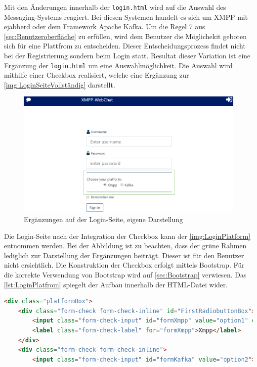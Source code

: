 \documentclass[a4paper,titlepage,halfparskip,12pt]{scrreprt}
\begin{document}
\begin{onehalfspacing}
Mit den Änderungen innerhalb der \texttt{login.html} wird auf die Auswahl des Messaging-Systems reagiert. Bei diesen Systemen handelt es sich um XMPP mit ejabberd oder dem Framework Apache Kafka. Um die Regel 7 aus \autoref{sec:Benutzeroberfläche} zu erfüllen, wird dem Benutzer die Möglichekit geboten sich für eine Plattfrom zu entscheiden. Dieser Entscheidungsprozess findet nicht bei der Registrierung sondern beim Login statt. Resultat dieser Variation ist eine Ergänzung der \texttt{login.html} um eine Auswahlmöglichkeit. Die Auswahl wird mithilfe einer Checkbox realisiert, welche eine Ergänzung zur \autoref{img:LoginSeiteVollständig} darstellt.
\begin{figure}[h]
	\centering
	\includegraphics[scale=0.4]{images/LoginPlatform}
	\caption{Ergänzungen auf der Login-Seite, eigene Darstellung}
	\label{img:LoginPlatform}
\end{figure}
Die Login-Seite nach der Integration der Checkbox kann der \autoref{img:LoginPlatform} entnommen werden. Bei der Abbildung ist zu beachten, dass der grüne Rahmen lediglich zur Darstellung der Ergänzungen beiträgt. Dieser ist für den Benutzer nicht ersichtlich. Die Konstruktion der Checkbox erfolgt mittels Bootstrap. Für die korrekte Verwendung von Bootstrap wird auf \autoref{sec:Bootstrap} verwiesen. Das \autoref{lst:LoginPlatfrom} spiegelt der Aufbau innerhalb der HTML-Datei wider.
\begin{lstlisting}[language=HTML,caption=Implementierung der Checkbox für die Plattform ,label={lst:LoginPlatfrom}]
<div class="platformBox">
	<div class="form-check form-check-inline" id="FirstRadiobuttonBox">
		<input class="form-check-input" id="formXmpp" value="option1" checked>
		<label class="form-check-label" for="formXmpp">Xmpp</label>
	</div>
	<div class="form-check form-check-inline">
		<input class="form-check-input" id="formKafka" value="option2">

\end{lstlisting}
\end{onehalfspacing}
\end{document}
